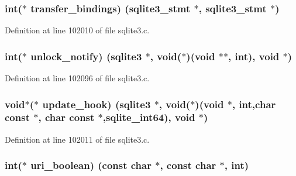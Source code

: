 \subsubsection[{transfer\+\_\+bindings}]{\setlength{\rightskip}{0pt plus 5cm}int($\ast$ transfer\+\_\+bindings) ({\bf sqlite3\+\_\+stmt} $\ast$, {\bf sqlite3\+\_\+stmt} $\ast$)}\label{structsqlite3__api__routines_a848b170b255643a1b3eda56a56da0eb7}


Definition at line 102010 of file sqlite3.\+c.

\hypertarget{structsqlite3__api__routines_aa15644f817581573e744b6a0b768c2fb}{}
\subsubsection[{unlock\+\_\+notify}]{\setlength{\rightskip}{0pt plus 5cm}int($\ast$ unlock\+\_\+notify) ({\bf sqlite3} $\ast$, void($\ast$)(void $\ast$$\ast$, int), void $\ast$)}\label{structsqlite3__api__routines_aa15644f817581573e744b6a0b768c2fb}


Definition at line 102096 of file sqlite3.\+c.

\hypertarget{structsqlite3__api__routines_a8239aff5ecf8ec2dfdf41c57e6a4444c}{}
\subsubsection[{update\+\_\+hook}]{\setlength{\rightskip}{0pt plus 5cm}void$\ast$($\ast$ update\+\_\+hook) ({\bf sqlite3} $\ast$, void($\ast$)(void $\ast$, int,char const $\ast$, char const $\ast$,{\bf sqlite\+\_\+int64}), void $\ast$)}\label{structsqlite3__api__routines_a8239aff5ecf8ec2dfdf41c57e6a4444c}


Definition at line 102011 of file sqlite3.\+c.

\hypertarget{structsqlite3__api__routines_a61df047cb68e954a5a8bdddf0f1e0d4f}{}
\subsubsection[{uri\+\_\+boolean}]{\setlength{\rightskip}{0pt plus 5cm}int($\ast$ uri\+\_\+boolean) (const char $\ast$, const char $\ast$, int)}\label{structsqlite3__api__routines_a61df047cb68e954a5a8bdddf0f1e0d4f}


